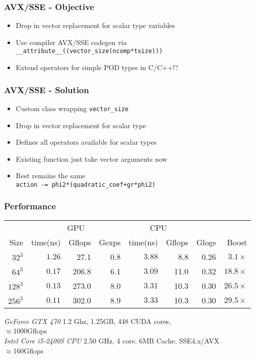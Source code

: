 \documentclass{beamer}
\begin{document}

\begin{frame}
\frametitle{AVX/SSE - Objective}
\begin{itemize}
\item Drop in vector replacement for scalar type variables
\item Use compiler AVX/SSE codegen via
  \texttt{\_\_attribute\_\_((vector\_size(ncomp*tsize)))}
\item Extend operators for simple POD types in C/C++!?
\end{itemize}
\end{frame}

\begin{frame}
\frametitle{AVX/SSE - Solution}
\begin{itemize}
\item Custom class wrapping \texttt{vector\_size}
\item Drop in vector replacement for scalar type
\item Defines all operators available for scalar types
\item Existing function just take vector arguments now
\item Rest remains the same \\
  \texttt{action -= phi2*(quadratic\_coef+gr*phi2)}
\end{itemize}
\end{frame}


\begin{frame} 

\frametitle{Performance}


\begin{center}
\def\arraystretch{1.1}%
\setlength{\tabcolsep}{0.25em}
\begin{tabular}{ r| r r r | r r r| r }
           & \multicolumn{3}{c|}{GPU}  & \multicolumn{2}{c}{CPU}   &  \\
    Size   & time(ns) & Gflops & Gexps &time(ns) & Gflops & Glogs & Boost \\
  \hline
   $32^3$  &  $1.26$  & 27.1  & 0.8& $3.88$     &8.8  & 0.26 &  $3.1 \times$ \\
   $64^3$  &  $0.17$  & 206.8 & 6.1& $3.09$     &11.0 & 0.32&$18.8 \times$ \\
  $128^3$  &  $0.13$  & 273.0 & 8.0& $3.31$     &10.3 & 0.30&$26.5 \times$ \\
  $256^3$  &  $0.11$  & 302.0 & 8.9& $3.33$     &10.3 & 0.30 &$29.5 \times$
\end{tabular}
\end{center}
\vfill
\small
\emph{GeForce GTX 470} 1.2 Ghz, 1.25GB, 448 CUDA cores,\\
 $\approx$1000Gflops\\
\emph{Intel Core i5-2400S CPU} 2.50 GHz, 4 core, 6MB Cache, SSE4.x/AVX\\
$\approx$160Gflops
\end{frame}
\end{document}
